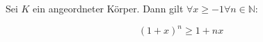 Sei $K$ ein angeordneter Körper. Dann gilt $\forall x \geq -1 \forall n \in \mathbb{N} :$


$$(1+x)^n \geq 1+nx$$